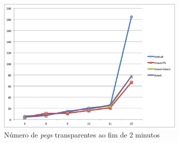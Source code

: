 \documentclass{llncs}
\begin{document}
\begin{figure}[ht]
\centering
\includegraphics[width=90mm]{grafico1.png}
\caption{N\'{u}mero de \emph{pegs} transparentes ao fim de 2 minutos}
\label{graf3}
\end{figure}
\end{document}
